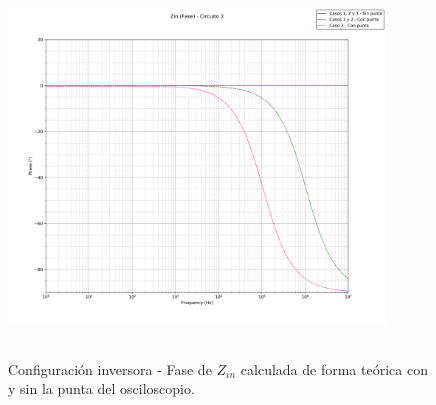 \begin{figure}[H] %
	\centering
	\includegraphics[width=10cm,height=10cm,keepaspectratio]{../EJ1/00GRAFICOS/teoricos/circ2zinfase.png}
	\caption{Configuración inversora - Fase de $Z_{in}$ calculada de forma te\'orica con y sin la punta del osciloscopio.}
	\label{c2zintp}
\end{figure}















































